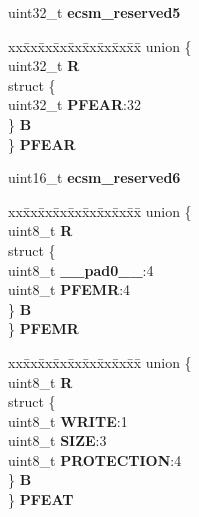 \begin{DoxyCompactItemize}
\begin{tabbing}
\end{tabbing}\item 
\mbox{\label{structECSM__tag_a0606a4b8de8f9391fed4c0a4c65673db}} 
uint32\+\_\+t {\bfseries ecsm\+\_\+reserved5}
\item 
\mbox{\label{structECSM__tag_aef6052767a54a0842a73bb45d63bbca2}} 
\begin{tabbing}
xx\=xx\=xx\=xx\=xx\=xx\=xx\=xx\=xx\=\kill
union \{\\
\>uint32\_t {\bfseries R}\\
\>struct \{\\
\>\>uint32\_t {\bfseries PFEAR}:32\\
\>\} {\bfseries B}\\
\} {\bfseries PFEAR}\\

\end{tabbing}\item 
\mbox{\label{structECSM__tag_a74ae8793547e9b4a4e9f9c213b7bd3fc}} 
uint16\+\_\+t {\bfseries ecsm\+\_\+reserved6}
\item 
\mbox{\label{structECSM__tag_a514b6912626a3b00dd19d42db2f35c5d}} 
\begin{tabbing}
xx\=xx\=xx\=xx\=xx\=xx\=xx\=xx\=xx\=\kill
union \{\\
\>uint8\_t {\bfseries R}\\
\>struct \{\\
\>\>uint8\_t {\bfseries \_\_pad0\_\_}:4\\
\>\>uint8\_t {\bfseries PFEMR}:4\\
\>\} {\bfseries B}\\
\} {\bfseries PFEMR}\\

\end{tabbing}\item 
\mbox{\label{structECSM__tag_ace945573815230139e52f6078231031c}} 
\begin{tabbing}
xx\=xx\=xx\=xx\=xx\=xx\=xx\=xx\=xx\=\kill
union \{\\
\>uint8\_t {\bfseries R}\\
\>struct \{\\
\>\>uint8\_t {\bfseries WRITE}:1\\
\>\>uint8\_t {\bfseries SIZE}:3\\
\>\>uint8\_t {\bfseries PROTECTION}:4\\
\>\} {\bfseries B}\\
\} {\bfseries PFEAT}\\


\end{tabbing}
\end{DoxyCompactItemize}
